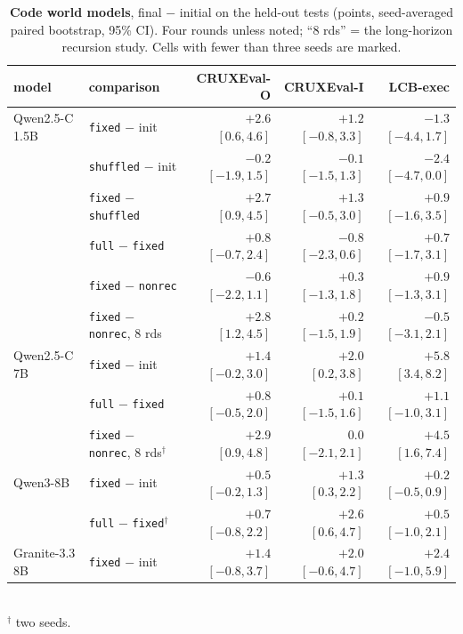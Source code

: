 \begin{table}[t]
  \centering
  \small
  \caption{\textbf{Code world models}, final $-$ initial on the held-out tests (points, seed-averaged paired bootstrap, 95\% CI). Four rounds unless noted; ``8 rds'' = the long-horizon recursion study. Cells with fewer than three seeds are marked.}
  \label{tab:code}
  \begin{tabular}{@{}llrrr@{}}
    \toprule
    model & comparison & CRUXEval-O & CRUXEval-I & LCB-exec \\
    \midrule
    Qwen2.5-C 1.5B & \texttt{fixed} $-$ init & $+2.6$ $[0.6, 4.6]$ & $+1.2$ $[-0.8, 3.3]$ & $-1.3$ $[-4.4, 1.7]$ \\
    & \texttt{shuffled} $-$ init & $-0.2$ $[-1.9, 1.5]$ & $-0.1$ $[-1.5, 1.3]$ & $-2.4$ $[-4.7, 0.0]$ \\
    & \texttt{fixed} $-$ \texttt{shuffled} & $+2.7$ $[0.9, 4.5]$ & $+1.3$ $[-0.5, 3.0]$ & $+0.9$ $[-1.6, 3.5]$ \\
    & \texttt{full} $-$ \texttt{fixed} & $+0.8$ $[-0.7, 2.4]$ & $-0.8$ $[-2.3, 0.6]$ & $+0.7$ $[-1.7, 3.1]$ \\
    & \texttt{fixed} $-$ \texttt{nonrec} & $-0.6$ $[-2.2, 1.1]$ & $+0.3$ $[-1.3, 1.8]$ & $+0.9$ $[-1.3, 3.1]$ \\
    & \texttt{fixed} $-$ \texttt{nonrec}, 8 rds & $+2.8$ $[1.2, 4.5]$ & $+0.2$ $[-1.5, 1.9]$ & $-0.5$ $[-3.1, 2.1]$ \\
    \midrule
    Qwen2.5-C 7B & \texttt{fixed} $-$ init & $+1.4$ $[-0.2, 3.0]$ & $+2.0$ $[0.2, 3.8]$ & $+5.8$ $[3.4, 8.2]$ \\
    & \texttt{full} $-$ \texttt{fixed} & $+0.8$ $[-0.5, 2.0]$ & $+0.1$ $[-1.5, 1.6]$ & $+1.1$ $[-1.0, 3.1]$ \\
    & \texttt{fixed} $-$ \texttt{nonrec}, 8 rds$^{\dagger}$ & $+2.9$ $[0.9, 4.8]$ & $0.0$ $[-2.1, 2.1]$ & $+4.5$ $[1.6, 7.4]$ \\
    \midrule
    Qwen3-8B & \texttt{fixed} $-$ init & $+0.5$ $[-0.2, 1.3]$ & $+1.3$ $[0.3, 2.2]$ & $+0.2$ $[-0.5, 0.9]$ \\
    & \texttt{full} $-$ \texttt{fixed}$^{\dagger}$ & $+0.7$ $[-0.8, 2.2]$ & $+2.6$ $[0.6, 4.7]$ & $+0.5$ $[-1.0, 2.1]$ \\
    \midrule
    Granite-3.3 8B & \texttt{fixed} $-$ init & $+1.4$ $[-0.8, 3.7]$ & $+2.0$ $[-0.6, 4.7]$ & $+2.4$ $[-1.0, 5.9]$ \\
    \bottomrule
  \end{tabular}\\[2pt]
  {\footnotesize $^{\dagger}$ two seeds.}
\end{table}

